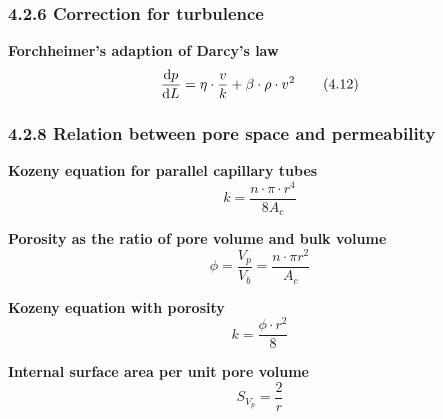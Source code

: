 \subsubsection{4.2.6 Correction for turbulence}
\textbf{Forchheimer's adaption of Darcy's law}
\begin{equation*}
    \frac{\mathop{}\!\mathrm{d} p}{\mathop{}\!\mathrm{d} L} = \eta\cdot\frac{v}{k} + \beta\cdot\rho\cdot v^2\tag{4.12}
\end{equation*}

\subsubsection{4.2.8 Relation between pore space and permeability}
\textbf{Kozeny equation for parallel capillary tubes}
\begin{equation*}
    k = \frac{n\cdot\pi\cdot r^4}{8 A_c}\tag{4.13}
\end{equation*}

\textbf{Porosity as the ratio of pore volume and bulk volume}
\begin{equation*}
    \phi = \frac{V_p}{V_b} = \frac{n\cdot\pi r^2}{A_c}\tag{4.14}
\end{equation*}

\textbf{Kozeny equation with porosity}
\begin{equation*}
    k = \frac{\phi\cdot r^2}{8}\tag{4.15}
\end{equation*}

\textbf{Internal surface area per unit pore volume}
\begin{equation*}
    S_{V_p} = \frac{2}{r}
\end{equation*}

